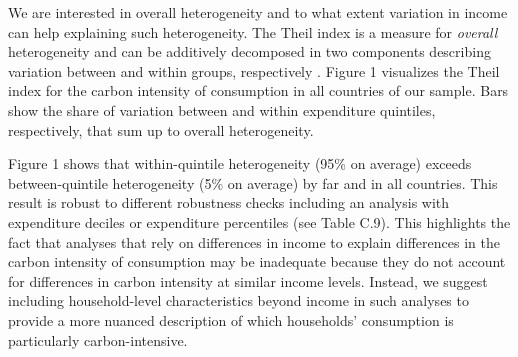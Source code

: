 \documentclass[11pt]{article}
\begin{document}
\begin{revisionbox}
    We are interested in overall heterogeneity and to what extent variation in income can help explaining such heterogeneity. The Theil index is a measure for \textit{overall} heterogeneity and can be additively decomposed in two components describing variation between and within groups, respectively \autocite{Shorrocks.1980,Cowell.2011a}. Figure 1 visualizes the Theil index for the carbon intensity of consumption in all countries of our sample. Bars show the share of variation between and within expenditure quintiles, respectively, that sum up to overall heterogeneity. 

Figure 1 shows that within-quintile heterogeneity (95\% on average) exceeds between-quintile heterogeneity (5\% on average) by far and in all countries. This result is robust to different robustness checks including an analysis with expenditure deciles or expenditure percentiles (see Table C.9). This highlights the fact that analyses that rely on differences in income to explain differences in the carbon intensity of consumption may be inadequate because they do not account for differences in carbon intensity at similar income levels. Instead, we suggest including household-level characteristics beyond income in such analyses to provide a more nuanced description of which households' consumption is particularly carbon-intensive.
\end{revisionbox}
\end{document}

